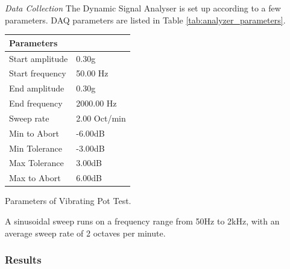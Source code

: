 \textit{Data Collection}\hspace{0.3cm} The Dynamic Signal Analyser is set up according to a few parameters. DAQ parameters are listed in Table \ref{tab:analyzer_parameters}. 

\begin{margintable}%
  \footnotesize
    \begin{tabular}{ll}
      \toprule
      Parameters                   &  \\
      \midrule
      Start amplitude       &  0.30g \\
      Start frequency       &  50.00 Hz \\
      End amplitude         &   0.30g \\
      End frequency         &  2000.00 Hz \\
      Sweep rate            & 2.00 Oct/min \\
      Min to Abort          & -6.00dB   \\
      Min Tolerance         & -3.00dB   \\
      Max Tolerance         & 3.00dB  \\
      Max to Abort          & 6.00dB  \\
      \bottomrule
    \end{tabular}

  \caption{Parameters of Vibrating Pot Test.}
  \label{tab:analyzer_parameters}
\end{margintable}

A sinusoidal sweep runs on a frequency range from 50Hz to 2kHz, with an average sweep rate of 2 octaves per minute.

\pagebreak
\subsubsection{Results}
    
    
